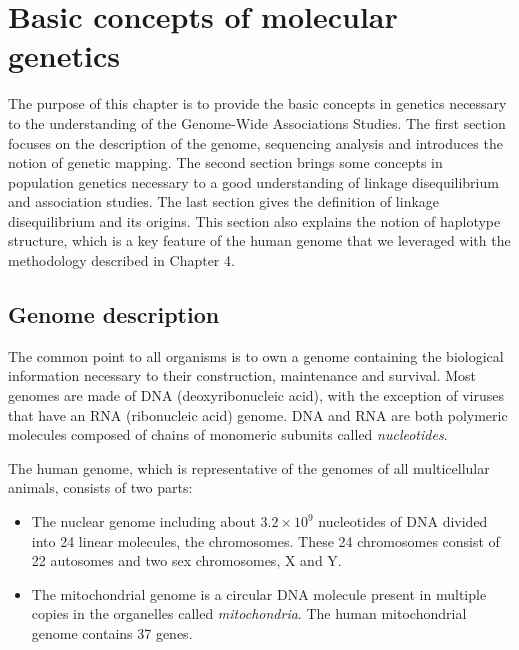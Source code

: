 \documentclass[]{book}
\begin{document}
\hypertarget{basic-concepts-of-molecular-genetics}{%
\chapter{Basic concepts of molecular genetics}\label{basic-concepts-of-molecular-genetics}}

The purpose of this chapter is to provide the basic concepts in genetics necessary to the understanding of the Genome-Wide Associations Studies. The first section focuses on the description of the genome, sequencing analysis and introduces the notion of genetic mapping. The second section brings some concepts in population genetics necessary to a good understanding of linkage disequilibrium and association studies. The last section gives the definition of linkage disequilibrium and its origins. This section also explains the notion of haplotype structure, which is a key feature of the human genome that we leveraged with the methodology described in Chapter 4.

\hypertarget{genome}{%
\section{Genome description}\label{genome}}

The common point to all organisms is to own a genome containing the
biological information necessary to their construction, maintenance and
survival. Most genomes are made of DNA (deoxyribonucleic acid), with the
exception of viruses that have an RNA (ribonucleic acid) genome. DNA and
RNA are both polymeric molecules composed of chains of monomeric
subunits called \emph{nucleotides}.

The human genome, which is representative of the genomes of all
multicellular animals, consists of two parts:

\begin{itemize}
\item
  The nuclear genome including about \(3.2 \times 10^9\) nucleotides of
  DNA divided into 24 linear molecules, the chromosomes. These 24
  chromosomes consist of 22 autosomes and two sex chromosomes, X
  and Y.
\item
  The mitochondrial genome is a circular DNA molecule present in
  multiple copies in the organelles called \emph{mitochondria}. The human
  mitochondrial genome contains 37 genes.
\end{itemize}
\end{document}
